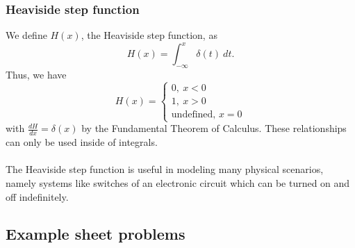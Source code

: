 \documentclass{article}
\begin{document}
\subsubsection*{Heaviside step function}
\begin{definition}
    We define $H(x)$, the Heaviside step function, as 
    \begin{equation*}
        H(x) = \int_{-\infty}^{x} \delta(t)\ dt.
    \end{equation*}
    Thus, we have
    \begin{equation*}
        H(x)=\begin{cases}
            0,\ x<0 \\
            1,\ x>0 \\
            \text{undefined, }x=0
        \end{cases}
    \end{equation*}
    with $\frac{dH}{dx} = \delta(x)$ by the Fundamental Theorem of Calculus. These relationships can only be used inside of integrals. \\ \\
    The Heaviside step function is useful in modeling many physical scenarios, namely systems like switches of an electronic circuit which can be turned on and off indefinitely.
\end{definition}

\subsection{Example sheet problems}
\end{document}
